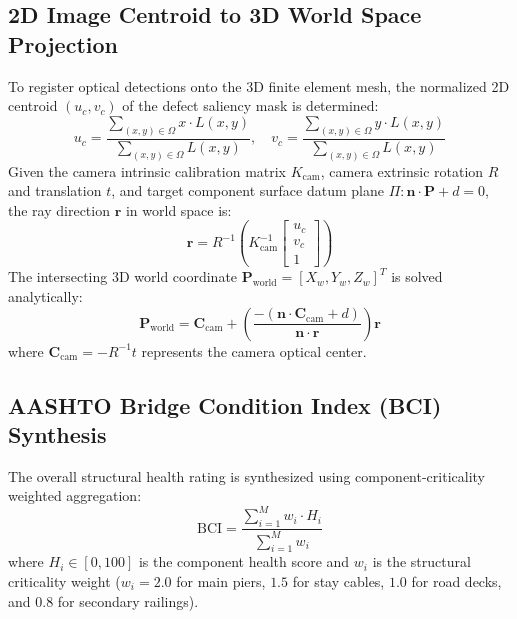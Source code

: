 \documentclass[10pt, conference, letterpaper]{IEEEtran}
\begin{document}
\subsection{2D Image Centroid to 3D World Space Projection}
To register optical detections onto the 3D finite element mesh, the normalized 2D centroid $(u_c, v_c)$ of the defect saliency mask is determined:
\begin{equation}
u_c = \frac{\sum_{(x,y) \in \Omega} x \cdot L(x,y)}{\sum_{(x,y) \in \Omega} L(x,y)}, \quad v_c = \frac{\sum_{(x,y) \in \Omega} y \cdot L(x,y)}{\sum_{(x,y) \in \Omega} L(x,y)}
\label{eq:centroid}
\end{equation}
Given the camera intrinsic calibration matrix $K_{\text{cam}}$, camera extrinsic rotation $R$ and translation $t$, and target component surface datum plane $\Pi: \mathbf{n} \cdot \mathbf{P} + d = 0$, the ray direction $\mathbf{r}$ in world space is:
\begin{equation}
\mathbf{r} = R^{-1} \left( K_{\text{cam}}^{-1} \begin{bmatrix} u_c \\ v_c \\ 1 \end{bmatrix} \right)
\label{eq:ray}
\end{equation}
The intersecting 3D world coordinate $\mathbf{P}_{\text{world}} = [X_w, Y_w, Z_w]^T$ is solved analytically:
\begin{equation}
\mathbf{P}_{\text{world}} = \mathbf{C}_{\text{cam}} + \left( \frac{-( \mathbf{n} \cdot \mathbf{C}_{\text{cam}} + d)}{\mathbf{n} \cdot \mathbf{r}} \right) \mathbf{r}
\label{eq:world_coord}
\end{equation}
where $\mathbf{C}_{\text{cam}} = -R^{-1}t$ represents the camera optical center.

\subsection{AASHTO Bridge Condition Index (BCI) Synthesis}
The overall structural health rating is synthesized using component-criticality weighted aggregation:
\begin{equation}
\text{BCI} = \frac{\sum_{i=1}^{M} w_i \cdot H_i}{\sum_{i=1}^{M} w_i}
\label{eq:bci}
\end{equation}
where $H_i \in [0, 100]$ is the component health score and $w_i$ is the structural criticality weight ($w_i = 2.0$ for main piers, $1.5$ for stay cables, $1.0$ for road decks, and $0.8$ for secondary railings).
\end{document}

